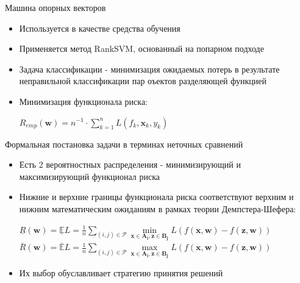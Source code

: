 \documentclass[11pt]{beamer}
\newcommand{\Rho}{%
	\mathcal{P}%
}
\begin{document}
\begin{frame}{Машина опорных векторов}

\begin{itemize}
	\item Используется в качестве средства обучения
	\item Применяется метод RankSVM, основанный на попарном подходе
	\item Задача классификации - минимизация ожидаемых потерь в результате неправильной классификации пар оъектов разделяющей функцией \linebreak
	\item Минимизация функционала риска:
	\begin{center}
	\(R_{emp}(\mathbf{w}) = n^{-1} \cdot \sum \limits_{k=1}^n L(f_k, \mathbf{x}_k, y_k)\)
	\end{center}
\end{itemize}

\end{frame}
\begin{frame}{Формальная постановка задачи в терминах неточных сравнений}

\begin{itemize}
	\item Есть 2 вероятностных распределения - минимизирующий и максимизирующий функционал риска
	\item Нижние и верхние границы функционала риска соответствуют верхним и нижним математическим ожиданиям в рамках теории Демпстера-Шефера:
	\begin{center}
		\(\underline{R}(\mathbf{w}) = \mathbb{\underline{E}}L = \frac{1}{n} \sum \limits_{(i,j) \in \Rho} \underset{\mathbf{x} \in \mathbf{A_i}, \mathbf{z} \in \mathbf{B_j}}{\operatorname{min}}L(f(\mathbf{x}, \mathbf{w}) - f(\mathbf{z}, \mathbf{w}))\) \linebreak
		\(\overline{R}(\mathbf{w}) = \mathbb{\overline{E}}L = \frac{1}{n} \sum \limits_{(i,j) \in \Rho} \underset{\mathbf{x} \in \mathbf{A_i}, \mathbf{z} \in \mathbf{B_j}}{\operatorname{max}}L(f(\mathbf{x}, \mathbf{w}) - f(\mathbf{z}, \mathbf{w}))\)
	\end{center} \linebreak
	\item Их выбор обуславливает стратегию принятия решений
\end{itemize}

\end{frame}
\end{document}
